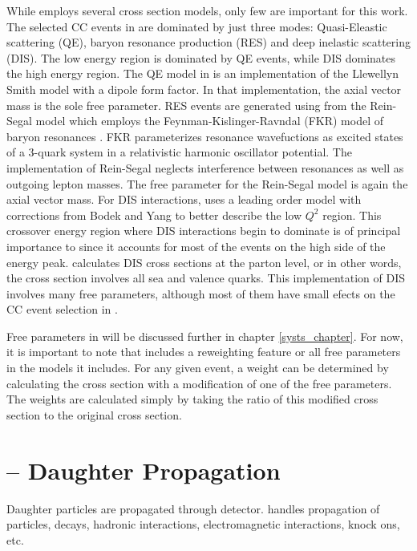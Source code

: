 While \genie employs several cross section models, only few are important for this work.  The selected \numu CC events in \nova are dominated by just three modes: Quasi-Eleastic scattering (QE),  baryon resonance production (RES) and deep inelastic scattering (DIS).  The low energy region is dominated by QE events, while DIS dominates the high energy region.  The QE model in \genie is an implementation of the Llewellyn Smith model \cite{LlewellynSmith} with a dipole form factor.  In that implementation, the axial vector mass is the sole free parameter.  RES events are generated using from the Rein-Segal model \cite{rein1981neutrino} which employs the Feynman-Kislinger-Ravndal (FKR) model of baryon resonances \cite{feynman1971current}.  FKR parameterizes resonance wavefuctions as excited states of a 3-quark system in a relativistic harmonic oscillator potential.  The \genie implementation of Rein-Segal neglects interference between resonances as well as outgoing lepton masses.  The free parameter for the \genie Rein-Segal model is again the axial vector mass.  For DIS interactions, \genie uses a leading order model with corrections from Bodek and Yang \cite{bodek2003higher} to better describe the low $Q^2$ region.  This crossover energy region where DIS interactions begin to dominate is of principal importance to \nova since it accounts for most of the events on the high side of the energy peak.  \genie calculates DIS cross sections at the parton level, or in other words, the cross section involves all sea and valence quarks.  This implementation of DIS involves many free parameters, although most of them have small efects on the \numu CC event selection in \nova.

Free parameters in \genie will be discussed further in chapter \ref{systs_chapter}.  For now, it is important to note that \genie includes a reweighting feature or all free parameters in the models it includes.  For any given event, a weight can be determined by calculating the cross section with a modification of one of the free parameters.  The weights are calculated simply by taking the ratio of this modified cross section to the original cross section.



\section{\geant -- Daughter Propagation}

Daughter particles are propagated through detector.  \geant handles propagation of particles, decays, hadronic interactions, electromagnetic interactions, knock ons, etc.

